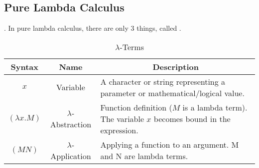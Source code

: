 \subsection{Pure Lambda Calculus}\label{subsec:Pure_Lambda_Calculus}.
In pure lambda calculus, there are only 3 things, called .

\begin{table}[h!tbp]
  \centering
  \begin{tabular}{ccp{15cm}}
    \toprule
    Syntax & Name & \multicolumn{1}{c}{Description} \\
    \midrule
    $x$ & Variable & A character or string representing a parameter or mathematical/logical value. \\
$ (\lambda x. M)$ & $\lambda$-Abstraction & Function definition ($M$ is a lambda term). The variable $x$ becomes bound in the expression. \\
    $(M N)$ & $\lambda$-Application & Applying a function to an argument. M and N are lambda terms. \\
    \bottomrule
  \end{tabular}
\caption{$\lambda$-Terms}
\label{tab:Lambda_Terms}
\end{table}


